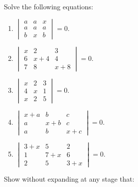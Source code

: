 Solve the following equations:

\begin{enumerate}[resume]
\item $\begin{vmatrix}a & a & x \\ a & a & a \\ b & x & b\end{vmatrix} = 0$.
\item $\begin{vmatrix}x & 2 & 3\\6 & x + 4 & 4\\7 & 8 & x + 8\end{vmatrix} = 0$.
\item $\begin{vmatrix}x & 2 & 3\\ 4 & x & 1\\ x & 2 & 5\end{vmatrix} = 0$.
\item $\begin{vmatrix}x + a & b & c\\ a & x + b & c\\ a & b & x + c\end{vmatrix} = 0$.
\item $\begin{vmatrix}3 + x & 5 & 2 \\ 1 & 7 + x & 6 \\ 2 & 5 & 3 + x\end{vmatrix} = 0$.
\end{enumerate}

Show without expanding at any stage that:

